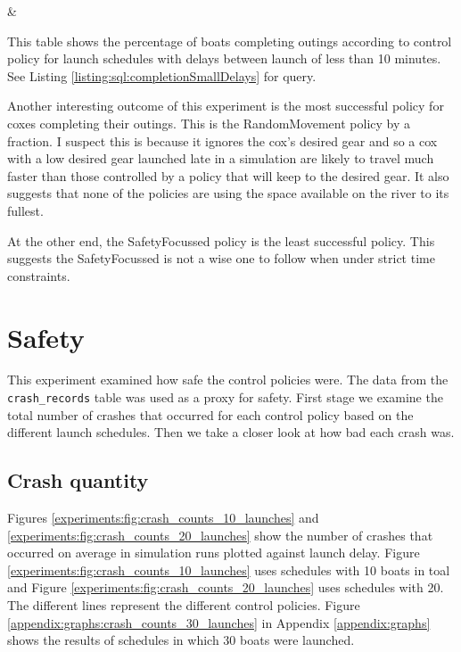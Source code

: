   \begin{table}[h]
  \centering
  {\cp & \landed}
  \caption{This table shows the percentage of boats completing outings according to control policy for launch schedules with delays between launch of less than 10 minutes. See Listing \ref{listing:sql:completionSmallDelays} for query.}
  \label{experiments:tab:returning_boats_by_policy_small_delay}
  \end{table}
  
  Another interesting outcome of this experiment is the most successful policy for coxes completing their outings. This is the RandomMovement policy by a fraction. I suspect this is because it ignores the cox's desired gear and so a cox with a low desired gear launched late in a simulation are likely to travel much faster than those controlled by a policy that will keep to the desired gear. It also suggests that none of the policies are using the space available on the river to its fullest.
  
  At the other end, the SafetyFocussed policy is the least successful policy. This suggests the SafetyFocussed is not a wise one to follow when under strict time constraints. 
  
\section{Safety}
This experiment examined how safe the control policies were. The data from the \texttt{crash\_records} table was used as a proxy for safety. First stage we examine the total number of crashes that occurred for each control policy based on the different launch schedules. Then we take a closer look at how bad each crash was.
  
  \subsection{Crash quantity}
  Figures \ref{experiments:fig:crash_counts_10_launches} and \ref{experiments:fig:crash_counts_20_launches} show the number of crashes that occurred on average in simulation runs plotted against launch delay. Figure \ref{experiments:fig:crash_counts_10_launches} uses schedules with 10 boats in toal and Figure \ref{experiments:fig:crash_counts_20_launches} uses schedules with 20. The different lines represent the different control policies. Figure \ref{appendix:graphs:crash_counts_30_launches} in Appendix \ref{appendix:graphs} shows the results of schedules in which 30 boats were launched.
  
